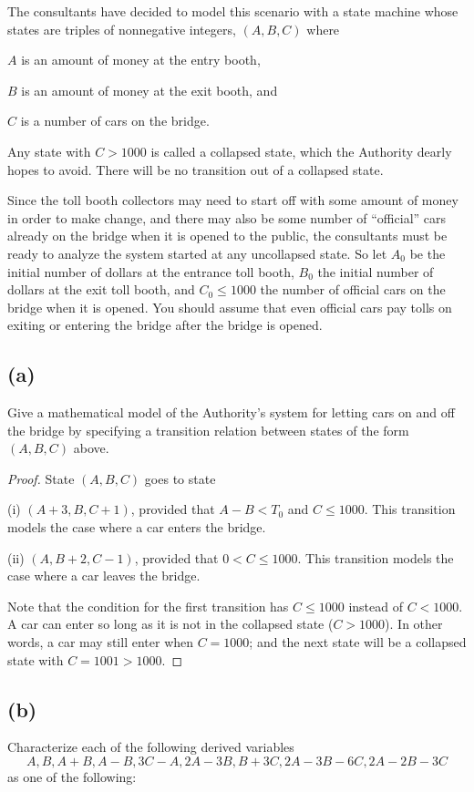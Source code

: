 \documentclass[14pt]{extarticle}
\begin{document}
The consultants have decided to model this scenario with a state machine whose states are triples of nonnegative integers, $(A, B, C)$ where 

$A$ is an amount of money at the entry booth,

$B$ is an amount of money at the exit booth, and

$C$ is a number of cars on the bridge.

Any state with $C > 1000$ is called a collapsed state, which the Authority dearly hopes to avoid. There will be no transition out of a collapsed state.

Since the toll booth collectors may need to start off with some amount of money in order to make change, and there may also be some number of “official” cars already on the bridge when it is opened to the public, the consultants must be ready to analyze the system started at any uncollapsed state. So let $A_0$ be the initial
number of dollars at the entrance toll booth, $B_0$ the initial number of dollars at the exit toll booth, and $C_0 \leq 1000$ the number of official cars on the bridge when it is opened. You should assume that even official cars pay tolls on exiting or entering the bridge after the bridge is opened.

\subsection{(a)}
Give a mathematical model of the Authority’s system for letting cars on and off the bridge by specifying a transition relation between states of the form $(A, B, C)$ above.
\begin{proof}
State $(A, B, C)$ goes to state

(i) $(A + 3, B, C + 1)$, provided that $A - B < T_0$ and $C \leq 1000$. This transition models the case where a car enters the bridge.

(ii) $(A, B + 2, C - 1)$, provided that $0 < C \leq 1000$. This transition models the case where a car leaves the bridge.

Note that the condition for the first transition has $C \leq 1000$ instead of $C < 1000$. A car can enter so long as it is not in the collapsed state ($C > 1000$). In other words, a car may still enter when $C = 1000$; and the next state will be a collapsed state with $C = 1001 > 1000$.
\end{proof}

\subsection{(b)}
Characterize each of the following derived variables
$$
A, B, A + B, A - B, 3C -A, 2A - 3B, B + 3C, 2A - 3B - 6C, 2A - 2B - 3C
$$
as one of the following:
\end{document}
